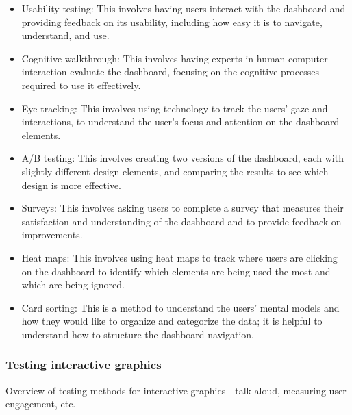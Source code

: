 \documentclass[
]{article}
\providecommand{\tightlist}{%
  \setlength{\itemsep}{0pt}\setlength{\parskip}{0pt}}
\begin{document}
\begin{itemize}
\tightlist
\item
  Usability testing: This involves having users interact with the
  dashboard and providing feedback on its usability, including how easy
  it is to navigate, understand, and use.
\item
  Cognitive walkthrough: This involves having experts in human-computer
  interaction evaluate the dashboard, focusing on the cognitive
  processes required to use it effectively.
\item
  Eye-tracking: This involves using technology to track the users' gaze
  and interactions, to understand the user's focus and attention on the
  dashboard elements.
\item
  A/B testing: This involves creating two versions of the dashboard,
  each with slightly different design elements, and comparing the
  results to see which design is more effective.
\item
  Surveys: This involves asking users to complete a survey that measures
  their satisfaction and understanding of the dashboard and to provide
  feedback on improvements.
\item
  Heat maps: This involves using heat maps to track where users are
  clicking on the dashboard to identify which elements are being used
  the most and which are being ignored.
\item
  Card sorting: This is a method to understand the users' mental models
  and how they would like to organize and categorize the data; it is
  helpful to understand how to structure the dashboard navigation.
\end{itemize}



\hypertarget{testing-interactive-graphics}{%
\subsubsection{Testing interactive
graphics}\label{testing-interactive-graphics}}

Overview of testing methods for interactive graphics - talk aloud,
measuring user engagement, etc.
\end{document}
